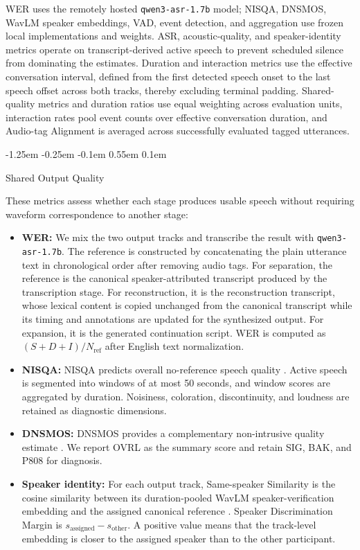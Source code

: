 \documentclass[10pt,twocolumn]{article}
\makeatletter
\renewcommand\subsection{%
  \@startsection{subsection}{2}{\z@}%
    {-1.25em \@plus -0.25em \@minus -0.1em}%
    {0.55em \@plus 0.1em}%
    {\normalfont\fontsize{10.5}{12.5}\selectfont\bfseries\raggedright
     \hyphenpenalty=10000\exhyphenpenalty=10000}}
\makeatother
\begin{document}
WER uses the remotely hosted \texttt{qwen3-asr-1.7b} model; NISQA, DNSMOS, WavLM speaker embeddings, VAD, event detection, and aggregation use frozen local implementations and weights. ASR, acoustic-quality, and speaker-identity metrics operate on transcript-derived active speech to prevent scheduled silence from dominating the estimates. Duration and interaction metrics use the effective conversation interval, defined from the first detected speech onset to the last speech offset across both tracks, thereby excluding terminal padding. Shared-quality metrics and duration ratios use equal weighting across evaluation units, interaction rates pool event counts over effective conversation duration, and Audio-tag Alignment is averaged across successfully evaluated tagged utterances.

\subsection{Shared Output Quality}

These metrics assess whether each stage produces usable speech without requiring waveform correspondence to another stage:
\begin{itemize}
    \item \textbf{WER:} We mix the two output tracks and transcribe the result with \texttt{qwen3-asr-1.7b}. The reference is constructed by concatenating the plain utterance text in chronological order after removing audio tags. For separation, the reference is the canonical speaker-attributed transcript produced by the transcription stage. For reconstruction, it is the reconstruction transcript, whose lexical content is copied unchanged from the canonical transcript while its timing and annotations are updated for the synthesized output. For expansion, it is the generated continuation script. WER is computed as $(S+D+I)/N_{\mathrm{ref}}$ after English text normalization.
    \item \textbf{NISQA:} NISQA predicts overall no-reference speech quality \citep{mittag2021nisqa}. Active speech is segmented into windows of at most 50 seconds, and window scores are aggregated by duration. Noisiness, coloration, discontinuity, and loudness are retained as diagnostic dimensions.
    \item \textbf{DNSMOS:} DNSMOS provides a complementary non-intrusive quality estimate \citep{reddy2021dnsmos}. We report OVRL as the summary score and retain SIG, BAK, and P808 for diagnosis.
    \item \textbf{Speaker identity:} For each output track, Same-speaker Similarity is the cosine similarity between its duration-pooled WavLM speaker-verification embedding and the assigned canonical reference \citep{chen2022wavlm}. Speaker Discrimination Margin is $s_{\mathrm{assigned}}-s_{\mathrm{other}}$. A positive value means that the track-level embedding is closer to the assigned speaker than to the other participant.
\end{itemize}
\end{document}
